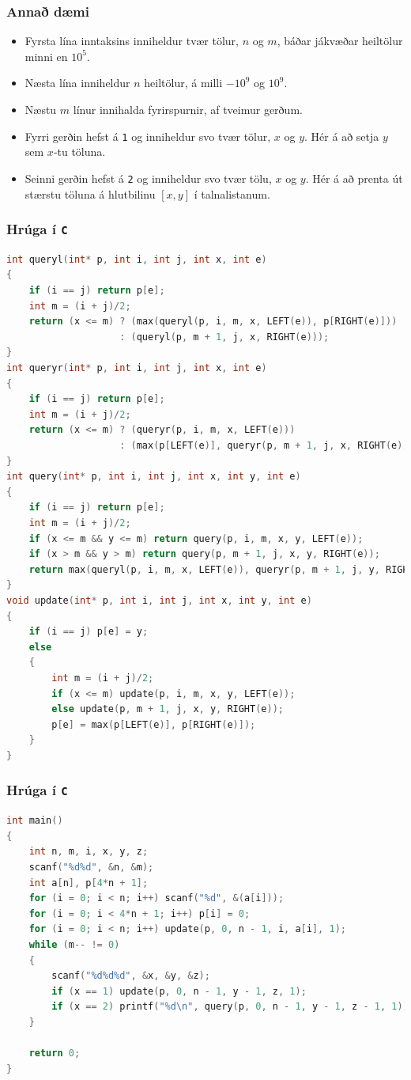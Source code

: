 \documentclass{beamer}
\begin{document}
\begin{frame}
\frametitle{Annað dæmi}
\begin{itemize}
\item<1-> Fyrsta lína inntaksins inniheldur tvær tölur, $n$ og $m$, báðar jákvæðar heiltölur minni en $10^5$.
\item<2-> Næsta lína inniheldur $n$ heiltölur, á milli $-10^9$ og $10^9$.
\item<3-> Næstu $m$ línur innihalda fyrirspurnir, af tveimur gerðum. 
\item<4-> Fyrri gerðin hefst á \texttt{1} og inniheldur svo tvær tölur, $x$ og $y$. Hér á að setja $y$ sem $x$-tu töluna.
\item<5-> Seinni gerðin hefst á \texttt{2} og inniheldur svo tvær tölu,
$x$ og $y$. Hér á að prenta út stærstu töluna á hlutbilinu $[x, y]$ í talnalistanum.
\end{itemize}
\end{frame}

\begin{frame}[fragile]
	\frametitle{Hrúga í \texttt{C}}
	\tiny
	\begin{lstlisting}[language=C]
int queryl(int* p, int i, int j, int x, int e)
{
	if (i == j) return p[e];
	int m = (i + j)/2;
	return (x <= m) ? (max(queryl(p, i, m, x, LEFT(e)), p[RIGHT(e)]))
                    : (queryl(p, m + 1, j, x, RIGHT(e)));
}
int queryr(int* p, int i, int j, int x, int e)
{
	if (i == j) return p[e];
	int m = (i + j)/2;
	return (x <= m) ? (queryr(p, i, m, x, LEFT(e)))
                    : (max(p[LEFT(e)], queryr(p, m + 1, j, x, RIGHT(e))));
}
int query(int* p, int i, int j, int x, int y, int e)
{
	if (i == j) return p[e];
	int m = (i + j)/2;
	if (x <= m && y <= m) return query(p, i, m, x, y, LEFT(e));
	if (x > m && y > m) return query(p, m + 1, j, x, y, RIGHT(e));
	return max(queryl(p, i, m, x, LEFT(e)), queryr(p, m + 1, j, y, RIGHT(e)));
}
void update(int* p, int i, int j, int x, int y, int e)
{
	if (i == j) p[e] = y;
	else
	{
		int m = (i + j)/2;
		if (x <= m) update(p, i, m, x, y, LEFT(e));
		else update(p, m + 1, j, x, y, RIGHT(e));
		p[e] = max(p[LEFT(e)], p[RIGHT(e)]);
	}
}
	\end{lstlisting}
\end{frame}

\begin{frame}[fragile]
	\frametitle{Hrúga í \texttt{C}}
	\tiny
	\begin{lstlisting}[language=C]
int main()
{
	int n, m, i, x, y, z;
	scanf("%d%d", &n, &m);
	int a[n], p[4*n + 1];
	for (i = 0; i < n; i++) scanf("%d", &(a[i]));
	for (i = 0; i < 4*n + 1; i++) p[i] = 0;
	for (i = 0; i < n; i++) update(p, 0, n - 1, i, a[i], 1);
	while (m-- != 0)
	{
		scanf("%d%d%d", &x, &y, &z);
		if (x == 1) update(p, 0, n - 1, y - 1, z, 1);
		if (x == 2) printf("%d\n", query(p, 0, n - 1, y - 1, z - 1, 1));
	}

	return 0;
}
	\end{lstlisting}
\end{frame}
\end{document}
